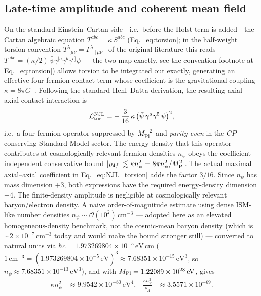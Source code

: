 \documentclass[aps,prd,twocolumn,superscriptaddress,showpacs,preprintnumbers,nofootinbib,longbibliography,floatfix]{revtex4-2}
\newcommand{\MPl}{M_{\rm Pl}}
\begin{document}
\subsection{Late-time amplitude and coherent mean field}
\label{sec:r1_njl}
On the standard Einstein--Cartan side---i.e.\ before the Holst term is
added---the Cartan algebraic equation $T^{abc} = \kappa\,S^{abc}$
(Eq.~\eqref{eq:torsion}; in the half-weight torsion convention
$T^\lambda{}_{\mu\nu} = \Gamma^\lambda{}_{[\mu\nu]}$ of the original
literature this reads $T^{abc} = (\kappa/2)\,
\bar\psi \gamma^{[a}\gamma^b\gamma^{c]} \psi$ --- the two map exactly,
see the convention footnote at Eq.~\eqref{eq:torsion}) allows torsion to
be integrated out exactly, generating an effective four-fermion
contact term whose coefficient is the gravitational coupling
$\kappa = 8\pi G$~\cite{Hehl1976,HehlDattaNJL1971}. Following the standard
Hehl--Datta derivation, the resulting axial--axial contact interaction is
\begin{equation}
\mathcal{L}^{\rm NJL}_{\rm tor}
= -\,\frac{3}{16}\,\kappa\,\bigl(\bar\psi\,\gamma^a\gamma^5\,\psi\bigr)^2,
\label{eq:NJL_torsion}
\end{equation}
i.e.\ a four-fermion operator suppressed by $M_{\rm Pl}^{-2}$ and
\emph{parity-even} in the $C\!P$-conserving Standard Model sector. The
energy density that this operator contributes at cosmologically relevant
fermion densities $n_\psi$ obeys the coefficient-independent conservative
bound $|\rho_{4f}|\lesssim\kappa n_\psi^2=8\pi n_\psi^2/M_{\rm Pl}^2$.
The actual maximal axial--axial coefficient in Eq.~\eqref{eq:NJL_torsion}
adds the factor $3/16$.  Since $n_\psi$ has mass dimension $+3$, both
expressions have the required energy-density dimension $+4$.
The finite-density amplitude is negligible at cosmologically relevant
baryon/electron density.
A naive order-of-magnitude estimate using dense ISM-like number
densities $n_\psi\sim\mathcal{O}(10^2)\,\text{cm}^{-3}$ --- adopted here
as an elevated homogeneous-density benchmark, not the
cosmic-mean baryon density (which is $\sim\!2\times 10^{-7}\,\text{cm}^{-3}$
today and would make the bound stronger still) --- converted to
natural units via $\hbar c = 1.973269804\times 10^{-5}\,\text{eV}\,\text{cm}$
($1\,\text{cm}^{-3} = (1.973269804\times 10^{-5}\,\text{eV})^3
\approx 7.68351\times10^{-15}\,\text{eV}^3$, so
$n_\psi\approx 7.68351\times10^{-13}\,\text{eV}^3$), and with
$\MPl=1.22089\times10^{28}\,\text{eV}$, gives
\begin{align}
\kappa n_\psi^2 &\approx 9.9542\times10^{-80}\,\text{eV}^4,
&\frac{\kappa n_\psi^2}{\rho_\Lambda}&\approx3.5571\times10^{-69}.
\end{align}
\end{document}
